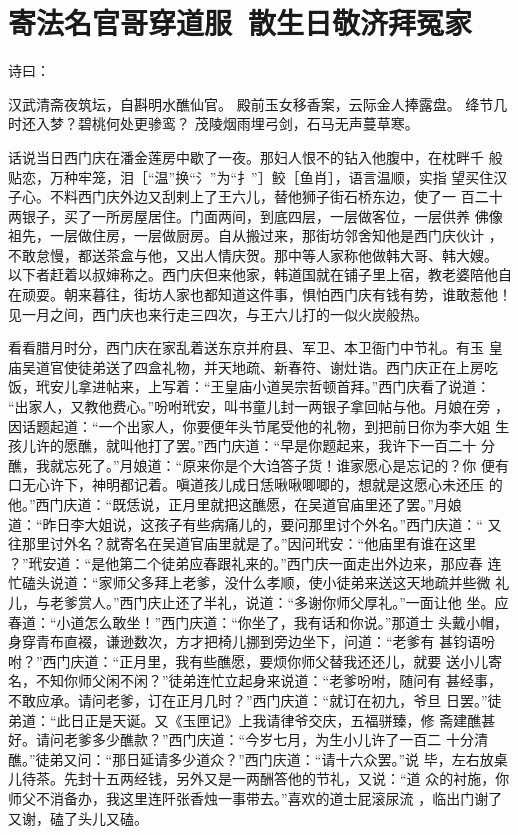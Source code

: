 \chapter{寄法名官哥穿道服~散生日敬济拜冤家}

诗曰：

汉武清斋夜筑坛，自斟明水醮仙官。
殿前玉女移香案，云际金人捧露盘。
绛节几时还入梦？碧桃何处更骖鸾？
茂陵烟雨埋弓剑，石马无声蔓草寒。

话说当日西门庆在潘金莲房中歇了一夜。那妇人恨不的钻入他腹中，在枕畔千
般贴恋，万种牢笼，泪［“温”换“氵”为“扌”］鲛［鱼肖］，语言温顺，实指
望买住汉子心。不料西门庆外边又刮剌上了王六儿，替他狮子街石桥东边，使了一
百二十两银子，买了一所房屋居住。门面两间，到底四层，一层做客位，一层供养
佛像祖先，一层做住房，一层做厨房。自从搬过来，那街坊邻舍知他是西门庆伙计
，不敢怠慢，都送茶盒与他，又出人情庆贺。那中等人家称他做韩大哥、韩大嫂。
以下者赶着以叔婶称之。西门庆但来他家，韩道国就在铺子里上宿，教老婆陪他自
在顽耍。朝来暮往，街坊人家也都知道这件事，惧怕西门庆有钱有势，谁敢惹他！
见一月之间，西门庆也来行走三四次，与王六儿打的一似火炭般热。

看看腊月时分，西门庆在家乱着送东京并府县、军卫、本卫衙门中节礼。有玉
皇庙吴道官使徒弟送了四盒礼物，并天地疏、新春符、谢灶诰。西门庆正在上房吃
饭，玳安儿拿进帖来，上写着：“王皇庙小道吴宗哲顿首拜。”西门庆看了说道：
“出家人，又教他费心。”吩咐玳安，叫书童儿封一两银子拿回帖与他。月娘在旁
，因话题起道：“一个出家人，你要便年头节尾受他的礼物，到把前日你为李大姐
生孩儿许的愿醮，就叫他打了罢。”西门庆道：“早是你题起来，我许下一百二十
分醮，我就忘死了。”月娘道：“原来你是个大诌答子货！谁家愿心是忘记的？你
便有口无心许下，神明都记着。嗔道孩儿成日恁啾啾唧唧的，想就是这愿心未还压
的他。”西门庆道：“既恁说，正月里就把这醮愿，在吴道官庙里还了罢。”月娘
道：“昨日李大姐说，这孩子有些病痛儿的，要问那里讨个外名。”西门庆道：“
又往那里讨外名？就寄名在吴道官庙里就是了。”因问玳安：“他庙里有谁在这里
？”玳安道：“是他第二个徒弟应春跟礼来的。”西门庆一面走出外边来，那应春
连忙磕头说道：“家师父多拜上老爹，没什么孝顺，使小徒弟来送这天地疏并些微
礼儿，与老爹赏人。”西门庆止还了半礼，说道：“多谢你师父厚礼。”一面让他
坐。应春道：“小道怎么敢坐！”西门庆道：“你坐了，我有话和你说。”那道士
头戴小帽，身穿青布直裰，谦逊数次，方才把椅儿挪到旁边坐下，问道：“老爹有
甚钧语吩咐？”西门庆道：“正月里，我有些醮愿，要烦你师父替我还还儿，就要
送小儿寄名，不知你师父闲不闲？”徒弟连忙立起身来说道：“老爹吩咐，随问有
甚经事，不敢应承。请问老爹，订在正月几时？”西门庆道：“就订在初九，爷旦
日罢。”徒弟道：“此日正是天诞。又《玉匣记》上我请律爷交庆，五福骈臻，修
斋建醮甚好。请问老爹多少醮款？”西门庆道：“今岁七月，为生小儿许了一百二
十分清醮。”徒弟又问：“那日延请多少道众？”西门庆道：“请十六众罢。”说
毕，左右放桌儿待茶。先封十五两经钱，另外又是一两酬答他的节礼，又说：“道
众的衬施，你师父不消备办，我这里连阡张香烛一事带去。”喜欢的道士屁滚尿流
，临出门谢了又谢，磕了头儿又磕。

